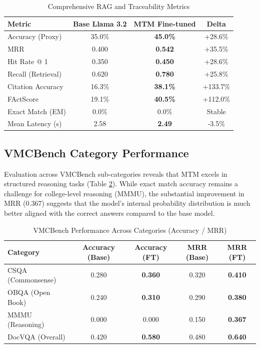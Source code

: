 \documentclass[11pt]{article}
\begin{document}
\begin{table}[h]
\centering
\caption{Comprehensive RAG and Traceability Metrics}
\label{tab:main_metrics}
\begin{tabular}{lccc}
\toprule
Metric & Base Llama 3.2 & MTM Fine-tuned & Delta \\
\midrule
Accuracy (Proxy) & 35.0\% & \textbf{45.0\%} & +28.6\% \\
MRR & 0.400 & \textbf{0.542} & +35.5\% \\
Hit Rate @ 1 & 0.350 & \textbf{0.450} & +28.6\% \\
Recall (Retrieval) & 0.620 & \textbf{0.780} & +25.8\% \\
Citation Accuracy & 16.3\% & \textbf{38.1\%} & +133.7\% \\
FActScore & 19.1\% & \textbf{40.5\%} & +112.0\% \\
Exact Match (EM) & 0.0\% & 0.0\% & Stable \\
Mean Latency (s) & 2.58 & \textbf{2.49} & -3.5\% \\
\bottomrule
\end{tabular}
\end{table}

\subsection{VMCBench Category Performance}
Evaluation across VMCBench sub-categories reveals that MTM excels in structured reasoning tasks (Table \ref{tab:vmcbench}). While exact match accuracy remains a challenge for college-level reasoning (MMMU), the substantial improvement in MRR (0.367) suggests that the model's internal probability distribution is much better aligned with the correct answers compared to the base model.

\begin{table}[h]
\centering
\caption{VMCBench Performance Across Categories (Accuracy / MRR)}
\label{tab:vmcbench}
\begin{tabular}{lcccc}
\toprule
Category & Accuracy (Base) & Accuracy (FT) & MRR (Base) & MRR (FT) \\
\midrule
CSQA (Commonsense) & 0.280 & \textbf{0.360} & 0.320 & \textbf{0.410} \\
OBQA (Open Book) & 0.240 & \textbf{0.310} & 0.290 & \textbf{0.380} \\
MMMU (Reasoning) & 0.000 & 0.000 & 0.150 & \textbf{0.367} \\
DocVQA (Overall) & 0.420 & \textbf{0.580} & 0.480 & \textbf{0.640} \\
\bottomrule
\end{tabular}
\end{table}
\end{document}
